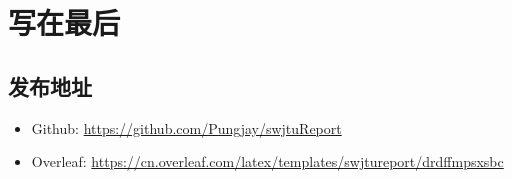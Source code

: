 \section{写在最后}
\subsection{发布地址}
\begin{itemize}
    \item Github: 
    \url{https://github.com/Pungjay/swjtuReport}
    \item Overleaf:  \url{https://cn.overleaf.com/latex/templates/swjtureport/drdffmpsxsbc}
\end{itemize}

